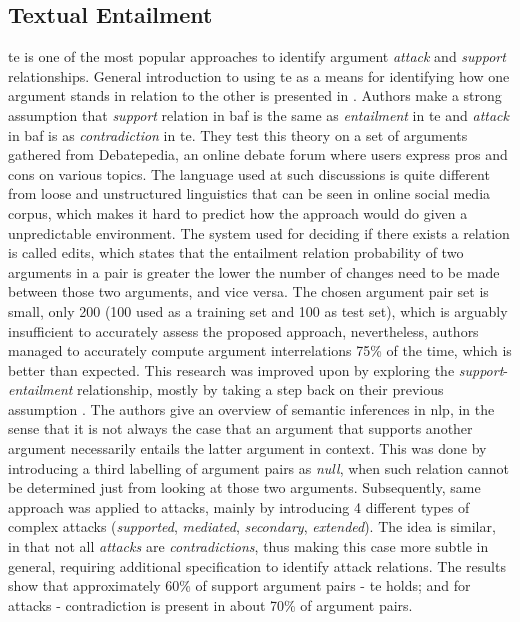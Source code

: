    \subsection{Textual Entailment}
        \gls{te} is one of the most popular approaches to identify argument \textit{attack} and \textit{support} relationships. General introduction to using \gls{te} as a means for identifying how one argument stands in relation to the other is presented in \autocite{Cabrio2012NaturalLA, Cabrio2012CombiningTE}. Authors make a strong assumption that \textit{support} relation in \gls{baf} is the same as \textit{entailment} in \gls{te} and \textit{attack} in \gls{baf} is as \textit{contradiction} in \gls{te}. They test this theory on a set of arguments gathered from Debatepedia, an online debate forum where users express pros and cons on various topics. The language used at such discussions is quite different from loose and unstructured linguistics that can be seen in online social media corpus, which makes it hard to predict how the approach would do given a unpredictable environment. The system used for deciding if there exists a relation is called \gls{edits}, which states that the entailment relation probability of two arguments in a pair is greater the lower the number of changes need to be made between those two arguments, and vice versa. The chosen argument pair set is small, only 200 (100 used as a training set and 100 as test set), which is arguably insufficient to accurately assess the proposed approach, nevertheless, authors managed to accurately compute argument interrelations 75\% of the time, which is better than expected. This research was improved upon by exploring the \textit{support}-\textit{entailment} relationship, mostly by taking a step back on their previous assumption \autocite{Cabrio2013ANL, Cabrio2013DetectingBS}. The authors give an overview of semantic inferences in \gls{nlp}, in the sense that it is not always the case that an argument that supports another argument necessarily entails the latter argument in context. This was done by introducing a third labelling of argument pairs as \textit{null}, when such relation cannot be determined just from looking at those two arguments. Subsequently, same approach was applied to attacks, mainly by introducing 4 different types of complex attacks (\textit{supported}, \textit{mediated}, \textit{secondary}, \textit{extended}). The idea is similar, in that not all \textit{attacks} are \textit{contradictions}, thus making this case more subtle in general, requiring additional specification to identify attack relations. The results show that approximately 60\% of support argument pairs - \gls{te} holds; and for attacks - contradiction is present in about 70\% of argument pairs.
     
